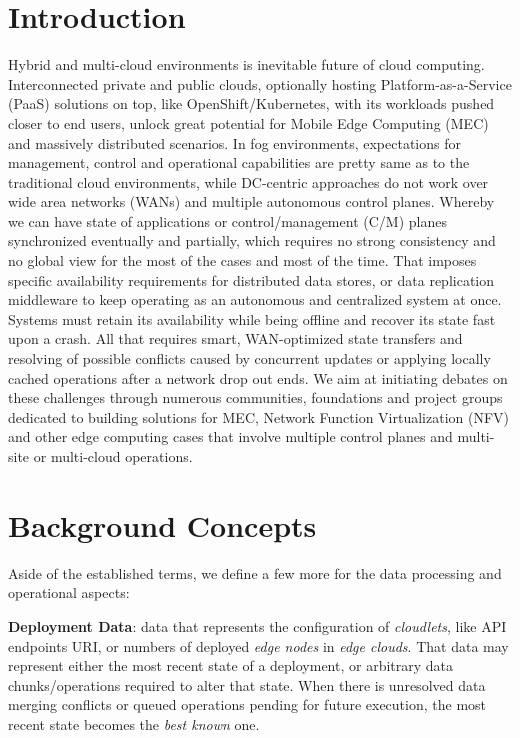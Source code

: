 \documentclass[conference]{IEEEtran}
\begin{document}
\section{Introduction}
Hybrid and multi-cloud environments is inevitable future of cloud computing.
Interconnected private and public clouds, optionally hosting
Platform-as-a-Service (PaaS) solutions on top, like OpenShift/Kubernetes, with
its workloads pushed closer to end users, unlock great potential for Mobile
Edge Computing (MEC) and massively distributed scenarios. In fog environments,
expectations for management, control and operational capabilities are pretty
same as to the traditional cloud environments, while DC-centric approaches do
not work over wide area networks (WANs) and multiple autonomous control planes.
Whereby we can have state of applications or control/management (C/M) planes
synchronized eventually and partially, which requires no strong consistency and
no global view for the most of the cases and most of the time. That imposes
specific availability requirements for distributed data stores, or data
replication middleware to keep operating as an autonomous and centralized
system at once. Systems must retain its availability while being offline and
recover its state fast upon a crash. All that requires smart, WAN-optimized
state transfers and resolving of possible conflicts caused by concurrent
updates or applying locally cached operations after a network drop out ends. We
aim at initiating debates on these challenges through numerous communities,
foundations and project groups dedicated to building solutions for MEC, Network
Function Virtualization (NFV) and other edge computing cases that involve
multiple control planes and multi-site or multi-cloud operations.

\section{Background Concepts}
Aside of the established terms\cite{b3}, we define a few more for the data
processing and operational aspects:

\textbf{Deployment Data}: data that represents the configuration of
\textit{cloudlets}\cite{b3}, like API endpoints URI, or numbers of deployed
\textit{edge nodes}\cite{b3} in \textit{edge clouds}\cite{b3}. That data may
represent either the most recent state of a deployment, or arbitrary data
chunks/operations required to alter that state. When there is unresolved data
merging conflicts or queued operations pending for future execution, the most
recent state becomes the \textit{best known} one.
\end{document}
